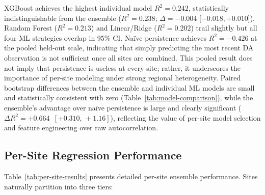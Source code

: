 \documentclass[toxins,article,submit,moreauthors]{Definitions/mdpi}
\begin{document}
XGBoost achieves the highest individual model $R^2 = 0.242$, statistically indistinguishable from the ensemble ($R^2 = 0.238$; $\Delta = -0.004$ [$-0.018, +0.010$]). Random Forest ($R^2 = 0.213$) and Linear/Ridge ($R^2 = 0.202$) trail slightly but all four ML strategies overlap in 95\% CI. Na\"ive persistence achieves $R^2 = -0.426$ at the pooled held-out scale, indicating that simply predicting the most recent DA observation is not sufficient once all sites are combined. This pooled result does not imply that persistence is useless at every site; rather, it underscores the importance of per-site modeling under strong regional heterogeneity. Paired bootstrap differences between the ensemble and individual ML models are small and statistically consistent with zero (Table~\ref{tab:model-comparison}), while the ensemble's advantage over na\"ive persistence is large and clearly significant ($\Delta R^2 = +0.664$\, $[+0.310,\, +1.16]$), reflecting the value of per-site model selection and feature engineering over raw autocorrelation.

\subsection{Per-Site Regression Performance}
\label{sec:results-per-site}

Table~\ref{tab:per-site-results} presents detailed per-site ensemble performance. Sites naturally partition into three tiers:
\end{document}
